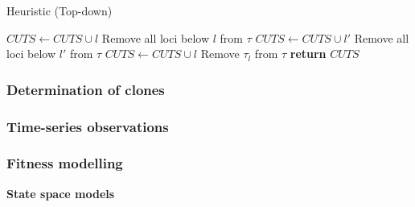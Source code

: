 \documentclass{article}
\begin{document}

\begin{algorithm}
\caption{Heuristic (Top-down) }\label{alg:atutocut}
\begin{algorithmic}[1]
        \State $CUTS \gets CUTS \cup l$
        \State Remove all loci below $l$ from $\tau$
    \Else
                \State $CUTS \gets CUTS \cup l'$
			    \State Remove all loci below $l'$ from $\tau$
            \EndIf
	    \EndFor
		    \State $CUTS \gets CUTS \cup l$
            \State Remove $\tau_l$ from $\tau$
        \EndIf
    \EndIf
\EndFor
\State \textbf{return} $CUTS$
\EndProcedure
\end{algorithmic}
\end{algorithm}



\subsubsection{Determination of clones}

\subsubsection{Time-series observations}

\subsubsection{Fitness modelling}

\textbf{State space models}
\end{document}

